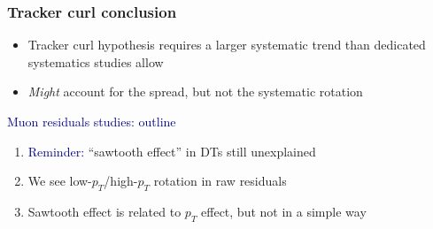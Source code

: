 \documentclass[compress]{beamer}
\begin{document}
\begin{frame}
\frametitle{Tracker curl conclusion}

\vspace{-1 cm}
\begin{itemize}
\item Tracker curl hypothesis requires a larger systematic trend than dedicated systematics studies allow
\item {\it Might} account for the spread, but not the systematic rotation
\end{itemize}

\vfill
\hspace{-0.83 cm} \textcolor{darkblue}{\Large Muon residuals studies: outline}

\vspace{0.4 cm}
\begin{enumerate}
\item \textcolor{darkblue}{Reminder:} ``sawtooth effect'' in DTs still unexplained
\item We see low-$p_T$/high-$p_T$ rotation in raw residuals
\item Sawtooth effect is related to $p_T$ effect, but not in a simple way
\end{enumerate}
\end{frame}
\end{document}
